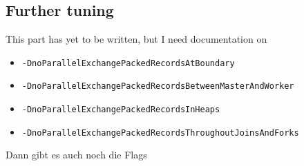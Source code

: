 \subsection{Further tuning}
This part has yet to be written, but I need documentation on 

\begin{itemize}
  \item \texttt{-DnoParallelExchangePackedRecordsAtBoundary}
  \item \texttt{-DnoParallelExchangePackedRecordsBetweenMasterAndWorker}
  \item \texttt{-DnoParallelExchangePackedRecordsInHeaps}
  \item \texttt{-DnoParallelExchangePackedRecordsThroughoutJoinsAndForks}
\end{itemize}

Dann gibt es auch noch die Flags

%



% 
% 

